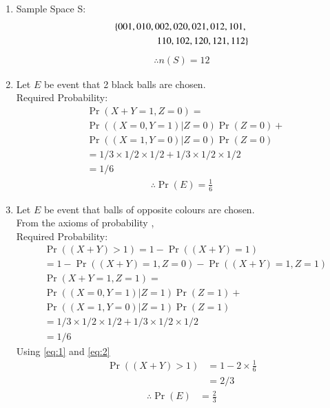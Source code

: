 \documentclass[journal,12pt,twocolumn]{IEEEtran}
\providecommand{\pr}[1]{\ensuremath{\Pr\left(#1\right)}}
\begin{document}
 
\begin{enumerate}[label =(\alph*)]
\item Sample Space S:
\begin{align}
\left\{001,010,002,020,021,012,101,\right.\\
 \left.110,102,120,121,112\right\} 
\end{align} 
\begin{align}
    \therefore n(S) = 12
\end{align}
\item Let $E$ be event that 2 black balls are chosen.\\
Required Probability:
\begin{align}  \label{eq:1}
&\pr{X+Y=1,Z=0} =\\ \nonumber
&\pr{ (X =0,Y=1) | Z=0}\pr{Z=0} +\\ \nonumber
&\pr{  (X =1,Y=0) | Z=0}\pr{Z=0}\\ 
&= 1/3\times1/2\times1/2 + 1/3\times1/2\times1/2\\ 
&= 1/6 
\end{align}
\begin{align}
\therefore \pr{E} = \frac{1}{6} 
\end{align}
\item Let $E$ be event that balls of opposite colours are chosen.\\
From the axioms of probability ,\\
Required Probability:
\begin{align}
&\pr{(X+Y)>1} = 1 - \pr{(X+Y)=1} \\ 
&=1-\pr{(X+Y)=1,Z =0} -\pr{(X+Y)=1,Z=1}  \\ \label{eq:2}
&\pr{X+Y=1,Z=1} =\\ \nonumber
&\pr{ (X =0,Y=1) | Z=1}\pr{Z=1} +\\ \nonumber
&\pr{  (X =1,Y=0) | Z=1}\pr{Z=1}\\ 
&= 1/3\times1/2\times1/2 + 1/3\times1/2\times1/2\\ 
&= 1/6  
\end{align}
Using \eqref{eq:1} and \eqref{eq:2}
\begin{align}
\pr{(X+Y)>1} &=1-2\times\frac{1}{6}\\
&=2/3
\end{align}
\begin{align}
\therefore \pr{E} &= \frac{2}{3}
\end{align}
\end{enumerate}
\end{document}
